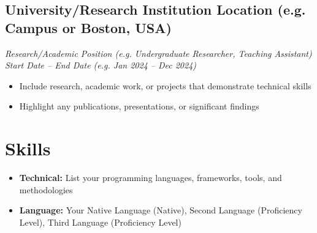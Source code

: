 \documentclass[a4paper,10pt]{article}
\begin{document}
    \subsection*{\texorpdfstring{
        \textbf{University/Research Institution} \hfill Location (e.g. Campus or Boston, USA)
        }{
            University/Research Institution -- Location
        }}
    \textit{Research/Academic Position (e.g. Undergraduate Researcher, Teaching Assistant) \hfill Start Date – End Date (e.g. Jan 2024 – Dec 2024)}
        \begin{itemize}
            \item Include research, academic work, or projects that demonstrate technical skills
            \item Highlight any publications, presentations, or significant findings
        \end{itemize}


\section{Skills}
    \begin{itemize}
        \item \textbf{Technical:} List your programming languages, frameworks, tools, and methodologies
        \item \textbf{Language:} Your Native Language (Native), Second Language (Proficiency Level), Third Language (Proficiency Level)
    \end{itemize}
\end{document}
